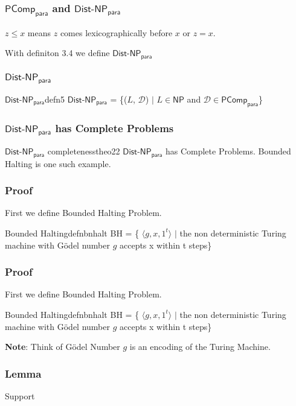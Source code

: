 \begin{frame}
    \frametitle{$\textsf{PComp}_{\textsf{para}}$ and $\textsf{Dist-NP}_{\textsf{para}}$}

    
    \begin{center}
        $z \leq x$ means $z$ comes lexicographically before \(x\) or \(z = x\).
        
        With definiton 3.4 we define $\textsf{Dist-NP}_{\textsf{para}}$
    \end{center}

\end{frame}

\begin{frame}
    \frametitle{$\textsf{Dist-NP}_{\textsf{para}}$}

    
    \begin{define}{$\textsf{Dist-NP}_{\textsf{para}}$}{defn5}
        $\textsf{Dist-NP}_{\textsf{para}}$ = \{($L$, $\mathcal{D}$) $\mid$ $L \in \textsf{NP}$ and $\mathcal{D} \in \textsf{PComp}_{\textsf{para}}$\}
    \end{define}

\end{frame}

\begin{frame}
    \frametitle{$\textsf{Dist-NP}_{\textsf{para}}$ has Complete Problems}

    
    \begin{theo}{$\textsf{Dist-NP}_{\textsf{para}}$ completeness}{theo22}
        $\textsf{Dist-NP}_{\textsf{para}}$ has Complete Problems. Bounded Halting is one such example.
    \end{theo}

\end{frame}

\begin{frame}
    \frametitle{Proof}

    First we define Bounded Halting Problem.

    \begin{define}{Bounded Halting}{defnbnhalt}
        \textsf{BH} = \{ $\langle g, x, 1^t \rangle$ \(\mid\) the non deterministic Turing machine with Gödel number $g$ accepts x within t steps\}
    \end{define}

\end{frame}


\begin{frame}
    \frametitle{Proof}

    First we define Bounded Halting Problem.

    \begin{define}{Bounded Halting}{defnbnhalt}
        \textsf{BH} = \{ $\langle g, x, 1^t \rangle$ \(\mid\) the non deterministic Turing machine with Gödel number $g$ accepts x within t steps\}
    \end{define}

    \textbf{Note}: Think of Gödel Number $g$ is an encoding of the Turing Machine.

\end{frame}

\begin{frame}
    \frametitle{Lemma}Support

    

\end{frame}